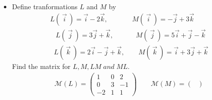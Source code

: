 \documentclass[10pt]{extarticle}
\newcommand{\reall}{\mathbb{R}}
\newcommand{\itembf}[1]{\item[\textbf{#1}]}
\begin{document}
\begin{itemize}
			\begin{proof}
				\begin{gather*}
					\vec{x}=(x_1,x_2)\qquad \vec{y}=(y_1,y_2)
					\\
					T\vec{x}+T\vec{y}=2\left(\frac{\vec{x}\cdot\vec{r}}{|\vec{r}|^2}\vec{r}\right)-\vec{x}+2\left(\frac{\vec{y}\cdot\vec{r}}{|\vec{r}|^2}\vec{r}\right)-\vec{y}
					=2\left(\frac{a(x_1+y_1)+b(x_2+y_2)}{a^2+b^2}\right)\vec{r}-(\vec{x}+\vec{y})
					\\
					\\
					=2\left(\frac{((x_1+y_1),(x_2+y_2))\cdot(a,b)}{a^2+b^2}\right)\vec{r}-(\vec{x}+\vec{y})=2\left(\frac{(\vec{x}+\vec{y})\cdot\vec{r}}{|\vec{r}|^2}\right)\vec{r}-(\vec{x}+\vec{y})=T(\vec{x}+\vec{y})
					\\
					\\
					\lambda T\vec{x}=\lambda\left(2\left(\frac{\vec{x}\cdot\vec{r}}{|\vec{r}|^2}\vec{r}\right)-\vec{x}\right)=2\left(\frac{\lambda\vec{x}\cdot\vec{r}}{|\vec{r}|^2}\vec{r}\right)-\lambda\vec{x}=T(\lambda\vec{x})\qquad \lambda\in\reall
					\\
					\\
					\textit{Reflection is a linear transformation since this function satisfy the properties of additivity
					}
					\\
					\textit{ and homogenity, besides  $ T(x,y) \in \reall^2 \; \quad \forall x,y\in \reall $}
				\end{gather*}
			\end{proof}
\clearpage
		\itembf{5.} Define tranformations $L$ and $M$ by
		\begin{gather*}
			L(\:\vec{i}\:)=\vec{i}-2\vec{k},\qquad  \quad\;\; M(\:\vec{i}\:)=-\vec{j}+3\vec{k}
			\\
			\;\;\; L(\:\vec{j}\:)=3\vec{j}+\vec{k},\qquad\quad\; M(\:\vec{j}\:)=5\vec{i}+\vec{j}-\vec{k}
			\\
			\;\; L(\:\vec{k}\:)=2\vec{i}-\vec{j}+\vec{k},\qquad M(\:\vec{k}\:)=\vec{i}+3\vec{j}+\vec{k}
		\end{gather*}
		Find the matrix for $ L,M,LM \; and \; ML.$
		\\
			\begin{gather*}
				\mathcal{M}(L)=
				\begin{pmatrix}
					1 & 0 & 2\\
					0 & 3 & -1\\
				   -2 & 1 & 1
				\end{pmatrix}	
				\qquad 
					\mathcal{M}(M)=
				\begin{pmatrix}

\end{pmatrix}
\end{gather*}
\end{itemize}
\end{document}
